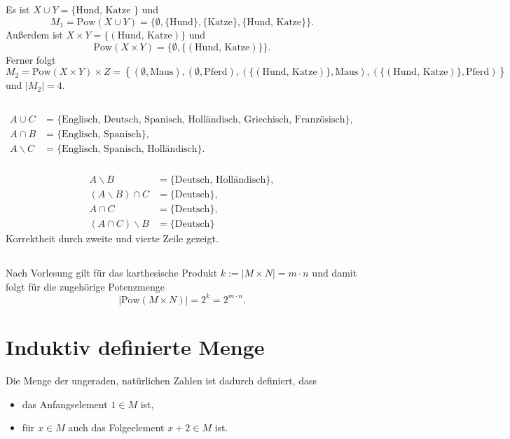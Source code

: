 \documentclass[a4paper]{article}
\newcommand{\pot}{\mathrm {Pow}}
\begin{document}
\subsection{}
Es ist $X\cup Y = \{\text{Hund, Katze }\}$ und 
$$M_1 = \pot( X\cup Y ) = \{ ∅, \{ \text{Hund}\}, \{\text{Katze}\}, \{\text{Hund, Katze}\}\}.$$
Außerdem ist $X\times Y = \{ (\text{Hund, Katze}) \}$ und
$$\pot( X\times Y) = \{ ∅, \{ (\text{Hund, Katze}) \} \}.$$
Ferner folgt
$$M_2 = \pot( X\times Y) \times Z = \left\{ (∅,\text{Maus}), (∅, \text{Pferd}), ( \{ (\text{Hund, Katze}) \},\text{Maus}), (\{ (\text{Hund, Katze}) \}, \text{Pferd} ) \right\}$$
und $|M_2| = 4$.
\subsection{}
\subsubsection{}
\begin{align*}
    A\cup C &= \{ \text{Englisch, Deutsch, Spanisch, Holländisch, Griechisch, Französisch} \},\\
    A \cap B &= \{ \text{Englisch, Spanisch} \},\\
    A\smallsetminus C &= \{ \text{Englisch, Spanisch, Holländisch} \}.
\end{align*}
\subsubsection{}
\begin{align*}
    A\smallsetminus B &= \{ \text{Deutsch, Holländisch} \},\\
    (A\smallsetminus B) \cap C &= \{ \text{Deutsch} \},\\
    A \cap C &= \{ \text{Deutsch} \},\\
    (A\cap C) \smallsetminus B &= \{ \text{Deutsch} \}
\end{align*}
Korrektheit durch zweite und vierte Zeile gezeigt.

\subsection{}
Nach Vorlesung gilt für das karthesische Produkt $k := |M\times N| = m\cdot n$ und damit folgt für die zugehörige Potenzmenge
$$|\pot ( M\times N)| = 2^k = 2^{m\cdot n}.$$

\section{Induktiv definierte Menge}
Die Menge der ungeraden, natürlichen Zahlen ist dadurch definiert, dass
\begin{itemize}
    \item das Anfangselement $1\in M$ ist, 
    \item für $x\in M$ auch das Folgeelement $x+2 \in M$ ist.
\end{itemize}
\end{document}
